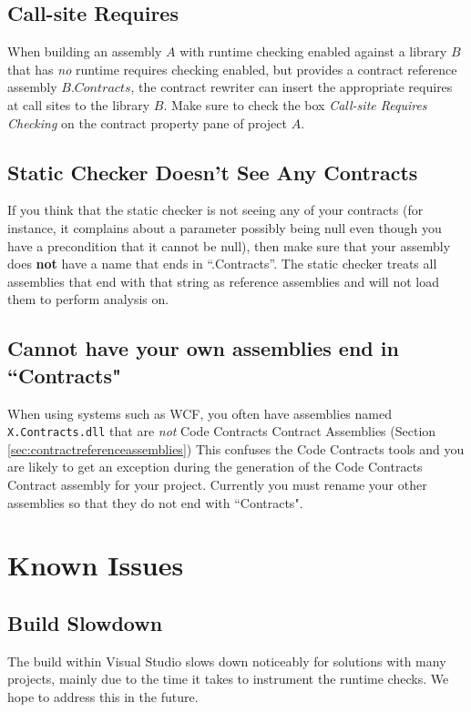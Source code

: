 \documentclass{article}
\newcommand{\code}[1]{\lstinline{#1}}
\begin{document}
\subsection{Call-site Requires}
When building an assembly $A$ with runtime checking enabled against a
library $B$ that has \emph{no} runtime
requires checking enabled, but provides a contract reference assembly $B.Contracts$,
the contract rewriter can insert the appropriate requires at call sites to
the library $B$. Make sure to check the box \emph{Call-site Requires
  Checking} on the contract property pane of project $A$.

\subsection{Static Checker Doesn't See Any Contracts}
If you think that the static checker is not seeing any of your contracts (for instance, it complains about
a parameter possibly being null even though you have a precondition that it cannot be null), then make sure
that your assembly does {\bf not} have a name that ends in ``.Contracts''.
The static checker treats all assemblies that end with that string as reference assemblies and will not load
them to perform analysis on.

\subsection{Cannot have your own assemblies end in ``Contracts"}
When using systems such as WCF, you often have assemblies named \code{X.Contracts.dll}
that are \emph{not} Code Contracts Contract Assemblies (Section
\ref{sec:contractreferenceassemblies})
This confuses the Code Contracts tools and you are likely to get an exception during
the generation of the Code Contracts Contract assembly for your project.
Currently you must rename your other assemblies so that they do not end with ``Contracts".

\section{Known Issues}
\label{sec:knownissues}
\subsection{Build Slowdown}
The build within Visual Studio slows down noticeably for solutions
with many projects, mainly due to the time it takes to instrument the
runtime checks. We hope to address this in the future.
\end{document}
